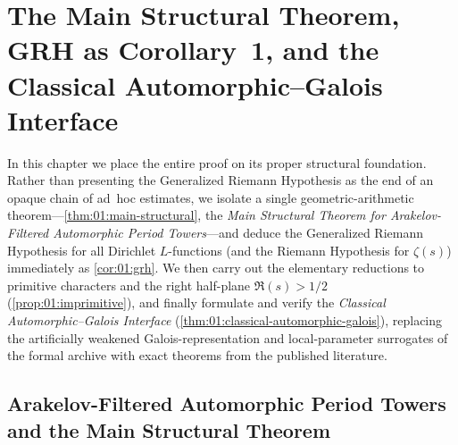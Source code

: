 \chapter{The Main Structural Theorem, GRH as Corollary~1, and the Classical Automorphic--Galois Interface}
\label{ch:01}

In this chapter we place the entire proof on its proper structural foundation. Rather than presenting the Generalized Riemann Hypothesis as the end of an opaque chain of ad~hoc estimates, we isolate a single geometric-arithmetic theorem—\cref{thm:01:main-structural}, the \emph{Main Structural Theorem for Arakelov-Filtered Automorphic Period Towers}—and deduce the Generalized Riemann Hypothesis for all Dirichlet $L$-functions (and the Riemann Hypothesis for $\zeta(s)$) immediately as \cref{cor:01:grh}. We then carry out the elementary reductions to primitive characters and the right half-plane $\Re(s) > 1/2$ (\cref{prop:01:imprimitive}), and finally formulate and verify the \emph{Classical Automorphic--Galois Interface} (\cref{thm:01:classical-automorphic-galois}), replacing the artificially weakened Galois-representation and local-parameter surrogates of the formal archive with exact theorems from the published literature.

\section{Arakelov-Filtered Automorphic Period Towers and the Main Structural Theorem}
\label{sec:01:main-structural}

